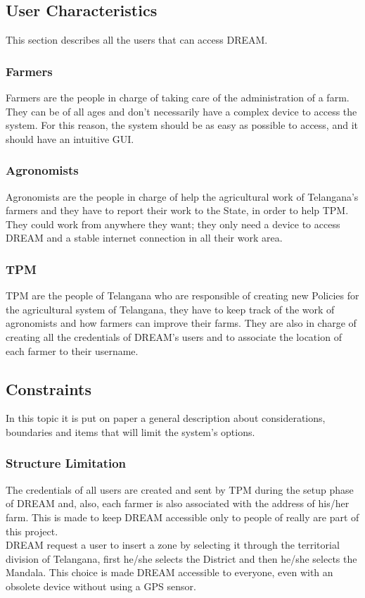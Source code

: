 \subsection{User Characteristics}
This section describes all the users that can access DREAM.
\subsubsection{Farmers}
Farmers are the people in charge of taking care of the administration of a farm. They can be of all ages and don’t necessarily have a complex device to access the system. For this reason, the system should be as easy as possible to access, and it should have an intuitive GUI.
\subsubsection{Agronomists}
Agronomists are the people in charge of help the agricultural work of Telangana’s farmers and they have to report their work to the State, in order to help TPM. They could work from anywhere they want; they only need a device to access DREAM and a stable internet connection in all their work area.
\subsubsection{TPM}
TPM are the people of Telangana who are responsible of creating new Policies for the agricultural system of Telangana, they have to keep track of the work of agronomists and how farmers can improve their farms. They are also in charge of creating all the credentials of DREAM’s users and to associate the location of each farmer to their username.

\subsection{Constraints}
In this topic it is put on paper a general description about considerations, boundaries and items that will limit the system’s options.
\subsubsection{Structure Limitation}
The credentials of all users are created and sent by TPM during the setup phase of DREAM and, also, each farmer is also associated with the address of his/her farm. This is made to keep DREAM accessible only to people of really are part of this project.\\
DREAM request a user to insert a zone by selecting it through the territorial division of Telangana, first he/she selects the District and then he/she selects the Mandala. This choice is made DREAM accessible to everyone, even with an obsolete device without using a GPS sensor.
